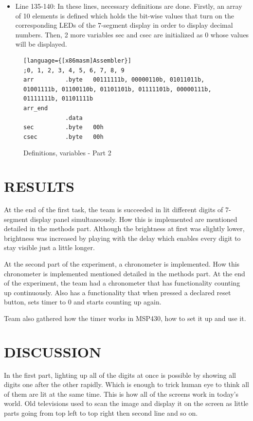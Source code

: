 \documentclass[pdftex,12pt,a4paper]{article}
\begin{document}
\begin{itemize}
    \item Line 135-140: In these lines, necessary definitions are done. Firstly, an array of 10 elements is defined which holds the bit-wise values that turn on the corresponding LEDs of the 7-segment display in order to display decimal numbers. Then, 2 more variables sec and csec are initialized as 0 whose values will be displayed.
\end{itemize}
\begin{figure}[H]
    \centering
    \begin{lstlisting}[firstnumber=135][language={[x86masm]Assembler}]
;0, 1, 2, 3, 4, 5, 6, 7, 8, 9
arr			.byte	00111111b, 00000110b, 01011011b, 01001111b, 01100110b, 01101101b, 01111101b, 00000111b, 01111111b, 01101111b
arr_end
			.data
sec			.byte	00h
csec 		.byte 	00h
    \end{lstlisting}
    \label{code:part1delay}
    \caption{Definitions, variables - Part 2}
\end{figure}


\newpage
\section{RESULTS}%
 
At the end of the first task, the team is succeeded in lit different digits of 7-segment display panel simultaneously. How this is implemented are mentioned detailed in the methods part. Although the brightness at first was slightly lower, brightness was increased by playing with the delay which enables every digit to stay visible just a little longer.

At the second part of the experiment, a chronometer is implemented. How this chronometer is implemented mentioned detailed in the methods part. At the end of the experiment, the team had a chronometer that has functionality counting up continuously. Also has a functionality that when pressed a declared reset button, sets timer to 0 and starts counting up again.

Team also gathered how the timer works in MSP430, how to set it up and use it.

\section{DISCUSSION}

In the first part, lighting up all of the digits at once is possible by showing all digits one after the other rapidly. Which is enough to trick human eye to think all of them are lit at the same time. This is how all of the screens work in today's world. Old televisions used to scan the image and display it on the screen as little parts going from top left to top right then second line and so on. 
\end{document}
